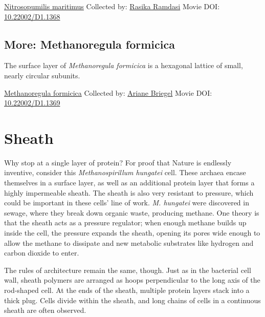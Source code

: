 \documentclass[]{tufte-book}
\begin{document}
\hypertarget{htmlwidget-5b2dd2222f650c4bcb55}{}

\label{fig:2-7c}\protect\hyperlink{tree}{Nitrosopumilis maritimus} Collected by: \protect\hyperlink{rasika_ramdasi}{Rasika Ramdasi} Movie DOI: \href{https://doi.org/10.22002/D1.1368}{10.22002/D1.1368}

\hypertarget{Methanoregula_formicica}{%
\subsection*{More: Methanoregula formicica}\label{Methanoregula_formicica}}

The surface layer of \emph{Methanoregula formicica} is a hexagonal lattice of small, nearly circular subunits.



\hypertarget{htmlwidget-059736226d0479672b9a}{}

\label{fig:2-7d}\protect\hyperlink{tree}{Methanoregula formicica} Collected by: \protect\hyperlink{ariane_briegel}{Ariane Briegel} Movie DOI: \href{https://doi.org/10.22002/D1.1369}{10.22002/D1.1369}

\hypertarget{sheath}{%
\section{Sheath}\label{sheath}}

Why stop at a single layer of protein? For proof that Nature is endlessly inventive, consider this \emph{Methanospirillum hungatei} cell. These archaea encase themselves in a surface layer, as well as an additional protein layer that forms a highly impermeable sheath. The sheath is also very resistant to pressure, which could be important in these cells' line of work. \emph{M. hungatei} were discovered in sewage, where they break down organic waste, producing methane. One theory is that the sheath acts as a pressure regulator; when enough methane builds up inside the cell, the pressure expands the sheath, opening its pores wide enough to allow the methane to dissipate and new metabolic substrates like hydrogen and carbon dioxide to enter.

The rules of architecture remain the same, though. Just as in the bacterial cell wall, sheath polymers are arranged as hoops perpendicular to the long axis of the rod-shaped cell. At the ends of the sheath, multiple protein layers stack into a thick plug. Cells divide within the sheath, and long chains of cells in a continuous sheath are often observed.
\end{document}
